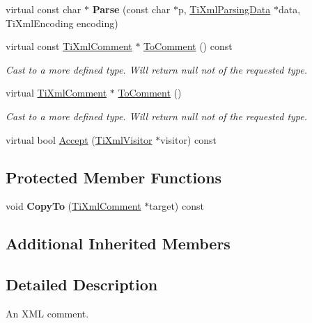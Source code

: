 \begin{DoxyCompactItemize}
virtual const char $\ast$ {\bfseries Parse} (const char $\ast$p, \hyperlink{classTiXmlParsingData}{Ti\+Xml\+Parsing\+Data} $\ast$data, Ti\+Xml\+Encoding encoding)
\item 
\mbox{\label{classTiXmlComment_a1032e176d3eb73017ceabc698cac0f16}} 
virtual const \hyperlink{classTiXmlComment}{Ti\+Xml\+Comment} $\ast$ \hyperlink{classTiXmlComment_a1032e176d3eb73017ceabc698cac0f16}{To\+Comment} () const
\begin{DoxyCompactList}\small\item\em Cast to a more defined type. Will return null not of the requested type. \end{DoxyCompactList}\item 
\mbox{\label{classTiXmlComment_acc7c7e07e13c23f17797d642981511df}} 
virtual \hyperlink{classTiXmlComment}{Ti\+Xml\+Comment} $\ast$ \hyperlink{classTiXmlComment_acc7c7e07e13c23f17797d642981511df}{To\+Comment} ()
\begin{DoxyCompactList}\small\item\em Cast to a more defined type. Will return null not of the requested type. \end{DoxyCompactList}\item 
virtual bool \hyperlink{classTiXmlComment_ac894241530d1d266131a5026cb251a95}{Accept} (\hyperlink{classTiXmlVisitor}{Ti\+Xml\+Visitor} $\ast$visitor) const
\end{DoxyCompactItemize}
\subsection*{Protected Member Functions}
\begin{DoxyCompactItemize}
\item 
\mbox{\label{classTiXmlComment_aaeb8a0b2d503f603879a2d04ceb54295}} 
void {\bfseries Copy\+To} (\hyperlink{classTiXmlComment}{Ti\+Xml\+Comment} $\ast$target) const
\end{DoxyCompactItemize}
\subsection*{Additional Inherited Members}


\subsection{Detailed Description}
An X\+ML comment. 


